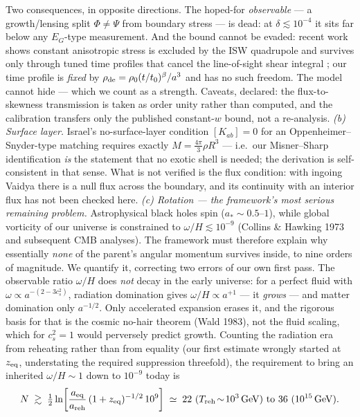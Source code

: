 \documentclass[11pt]{article}
\begin{document}
Two consequences, in opposite directions. The hoped-for \emph{observable} --- a growth/lensing
split $\Phi \neq \Psi$ from boundary stress --- is dead: at $\delta \lesssim 10^{-4}$ it sits far
below any $E_G$-type measurement. And the bound cannot be evaded: recent work shows constant
anisotropic stress is excluded by the ISW quadrupole and survives only through tuned time profiles
that cancel the line-of-sight shear integral \cite{HowIsotropic2026}; our time profile is
\emph{fixed} by $\rho_{\rm de} = \rho_0(t/t_0)^\beta/a^3$ and has no such freedom. The model cannot
hide --- which we count as a strength. Caveats, declared: the flux-to-skewness transmission is
taken as order unity rather than computed, and the calibration transfers only the published
constant-$w$ bound, not a re-analysis. \emph{(b) Surface layer.}
Israel's no-surface-layer condition $[K_{ab}] = 0$ for an Oppenheimer--Snyder-type matching requires
exactly $M = \tfrac{4\pi}{3}\rho R^3$ --- i.e.\ our Misner--Sharp identification \emph{is} the
statement that no exotic shell is needed; the derivation is self-consistent in that sense. What is
not verified is the flux condition: with ingoing Vaidya there is a null flux across the boundary,
and its continuity with an interior flux has not been checked here. \emph{(c) Rotation --- the
framework's most serious remaining problem.} Astrophysical black holes spin ($a_* \sim 0.5$--$1$),
while global vorticity of our universe is constrained to $\omega/H \lesssim 10^{-9}$ (Collins \&
Hawking 1973 and subsequent CMB analyses). The framework must therefore explain why essentially
\emph{none} of the parent's angular momentum survives inside, to nine orders of magnitude. We quantify it, correcting two errors of our own first pass. The
observable ratio $\omega/H$ does \emph{not} decay in the early universe: for a perfect fluid with
$\omega \propto a^{-(2-3c_s^2)}$, radiation domination gives $\omega/H \propto a^{+1}$ --- it
\emph{grows} --- and matter domination only $a^{-1/2}$. Only accelerated expansion erases it, and
the rigorous basis for that is the cosmic no-hair theorem (Wald 1983), not the fluid scaling, which
for $c_s^2 = 1$ would perversely predict growth. Counting the radiation era from reheating rather
than from equality (our first estimate wrongly started at $z_{\rm eq}$, understating the required
suppression threefold), the requirement to bring an inherited $\omega/H \sim 1$ down to
$10^{-9}$ today is
\begin{equation}
N \;\gtrsim\; \tfrac{1}{2}\ln\!\left[\frac{a_{\rm eq}}{a_{\rm reh}}\,(1+z_{\rm eq})^{-1/2}\,10^{9}\right]
\;\simeq\; 22\ (T_{\rm reh}\!\sim\!10^{3}\,\mathrm{GeV})\ \text{to}\ 36\ (10^{15}\,\mathrm{GeV}).
\end{equation}
\end{document}
